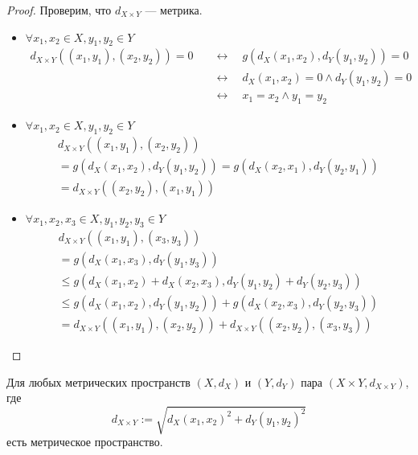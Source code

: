 \documentclass[12pt,a4paper]{article}
\begin{document}
    \begin{proof}
        Проверим, что $d_{X \times Y}$ --- метрика.
        \begin{itemize}
            \item $\forall x_1, x_2 \in X, y_1, y_2 \in Y$
                \begin{align*}
                    d_{X \times Y}((x_1, y_1), (x_2, y_2)) = 0\quad
                    &\longleftrightarrow\quad g(d_X(x_1, x_2), d_Y(y_1, y_2)) = 0\\
                    &\longleftrightarrow\quad d_X(x_1, x_2) = 0 \wedge d_Y(y_1, y_2) = 0\\
                    &\longleftrightarrow\quad x_1 = x_2 \wedge y_1 = y_2
                \end{align*}
            \item $\forall x_1, x_2 \in X, y_1, y_2 \in Y$
                \begin{multline*}
                    d_{X \times Y}((x_1, y_1), (x_2, y_2))\\
                    = g(d_X(x_1, x_2), d_Y(y_1, y_2)) = g(d_X(x_2, x_1), d_Y(y_2, y_1))\\
                    = d_{X \times Y}((x_2, y_2), (x_1, y_1))
                \end{multline*}
            \item $\forall x_1, x_2, x_3 \in X, y_1, y_2, y_3 \in Y$
                \begin{multline*}
                    d_{X \times Y}((x_1, y_1), (x_3, y_3))\\
                    = g(d_X(x_1, x_3), d_Y(y_1, y_3))\\
                    \leqslant g(d_X(x_1, x_2) + d_X(x_2, x_3), d_Y(y_1, y_2) + d_Y(y_2, y_3))\\
                    \leqslant g(d_X(x_1, x_2), d_Y(y_1, y_2)) + g(d_X(x_2, x_3), d_Y(y_2, y_3))\\
                    = d_{X \times Y}((x_1, y_1), (x_2, y_2)) + d_{X \times Y}((x_2, y_2), (x_3, y_3))
                \end{multline*}
        \end{itemize}
    \end{proof}

    \begin{corollary}
        Для любых метрических пространств $(X, d_X)$ и $(Y, d_Y)$ пара $(X \times Y, d_{X \times Y})$, где
        \[d_{X \times Y} := \sqrt{d_X(x_1, x_2)^2 + d_Y(y_1, y_2)^2}\]
        есть метрическое пространство.
    \end{corollary}
\end{document}
